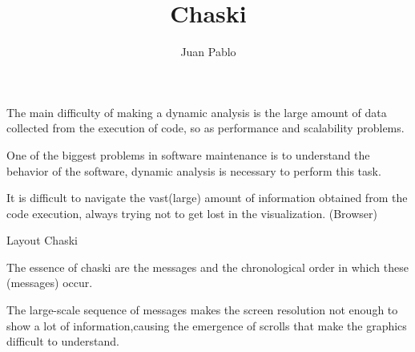 \documentclass{elsart}
\begin{document}
\begin{frontmatter}



\title{Chaski}


\author{Juan Pablo}

\address{}

\begin{abstract}
\end{abstract}

\begin{keyword}

\PACS 
\end{keyword}
\end{frontmatter}

\section{}

The main difficulty of making a dynamic analysis is the large amount of data collected from the execution of code, so as performance and scalability problems.

One of the biggest problems in software maintenance is to understand the behavior of the software, dynamic analysis is necessary to perform this task.

It is difficult to navigate the vast(large) amount of information obtained from the code execution, always trying not to get lost in the visualization. (Browser)


Layout Chaski

The essence of chaski are the messages and the chronological order in which these (messages) occur.

The large-scale sequence of messages makes the screen resolution not enough to show a lot of information,causing the emergence of scrolls that make the graphics difficult to understand.
\end{document}

